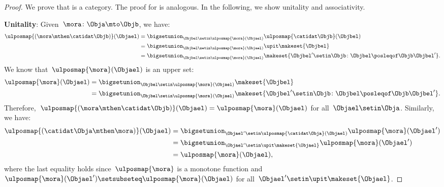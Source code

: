 \begin{proof}
    We prove that \UPos is a category.
    The proof for \LPos is analogous.
    In the following, we show unitality and associativity.

    \textbf{Unitality}:
    Given~$\mora\colon \Obja \mto \Objb$, we have:
    \begin{equation}
        \begin{aligned}
            \ulposmap{\left( \mora \mthen \catidat\Objb\right)}(\Objael) & =\bigsetunion_{\Objbel\setin \ulposmap{\mora}(\Objael)}\ulposmap{\catidat\Objb}(\Objbel) \\
                                                                         & =\bigsetunion_{\Objbel\setin \ulposmap{\mora}(\Objael)}\upit\makeset{\Objbel} \\
                                                                         & =\bigsetunion_{\Objbel\setin \ulposmap{\mora}(\Objael)}\makeset{\Objbel'\setin \Objb \colon \Objbel\posleqof\Objb \Objbel' }.
        \end{aligned}
    \end{equation}
    We know that~$\ulposmap{\mora}(\Objael)$ is an upper set:
    \begin{equation}
        \begin{aligned}
            \ulposmap{\mora}(\Objael) & =\bigsetunion_{\Objbel\setin \ulposmap{\mora}(\Objael)}\makeset{\Objbel} \\
                                      & =\bigsetunion_{\Objbel\setin \ulposmap{\mora}(\Objael)}\makeset{ \Objbel'\setin \Objb \colon \Objbel\posleqof\Objb \Objbel'}.
        \end{aligned}
    \end{equation}
    Therefore,~$\ulposmap{\left( \mora \mthen \catidat\Objb\right)}(\Objael)=\ulposmap{\mora}(\Objael)$ for all~$\Objael\setin \Obja$.
    Similarly, we have:
    \begin{equation}
        \begin{aligned}
            \ulposmap{(\catidat\Obja \mthen \mora)}(\Objael) & =\bigsetunion_{\Objael'\setin \ulposmap{\catidat\Obja}(\Objael)}\ulposmap{\mora}(\Objael') \\
                                                             & =\bigsetunion_{\Objael'\setin \upit \makeset{\Objael}}\ulposmap{\mora}(\Objael') \\
                                                             & =\ulposmap{\mora}(\Objael),
        \end{aligned}
    \end{equation}
    where the last equality holds since~$\ulposmap{\mora}$ is a monotone function and~$\ulposmap{\mora}(\Objael')\setsubseteq \ulposmap{\mora}(\Objael)$ for all~$\Objael'\setin \upit \makeset{\Objael}$.


\end{proof}
